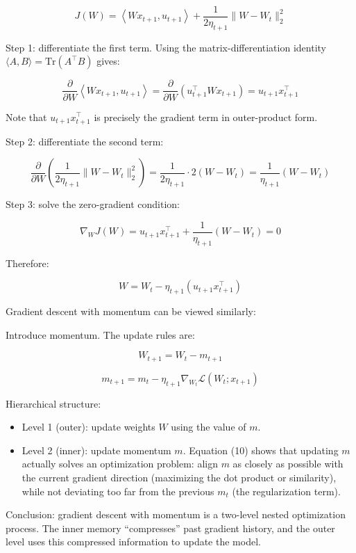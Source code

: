 \[
J(W)=\left\langle Wx_{t+1},u_{t+1}\right\rangle+\frac{1}{2\eta_{t+1}}\lVert W-W_t\rVert_2^2
\]

Step 1: differentiate the first term. Using the matrix-differentiation identity \(\langle A,B\rangle=\mathrm{Tr}(A^\top B)\) gives:

\[
\frac{\partial}{\partial W}\left\langle Wx_{t+1},u_{t+1}\right\rangle
=\frac{\partial}{\partial W}\left(u_{t+1}^{\top}Wx_{t+1}\right)
=u_{t+1}x_{t+1}^{\top}
\]

Note that \(u_{t+1}x_{t+1}^{\top}\) is precisely the gradient term in outer-product form.

Step 2: differentiate the second term:

\[
\frac{\partial}{\partial W}\left(\frac{1}{2\eta_{t+1}}\lVert W-W_t\rVert_2^2\right)
=\frac{1}{2\eta_{t+1}}\cdot 2(W-W_t)
=\frac{1}{\eta_{t+1}}(W-W_t)
\]

Step 3: solve the zero-gradient condition:

\[
\nabla_W J(W)=u_{t+1}x_{t+1}^{\top}+\frac{1}{\eta_{t+1}}(W-W_t)=0
\]

Therefore:

\[
W=W_t-\eta_{t+1}(u_{t+1}x_{t+1}^{\top})
\]

Gradient descent with momentum can be viewed similarly:

Introduce momentum. The update rules are:

\[
W_{t+1}=W_t-m_{t+1}
\tag{7}
\]

\[
m_{t+1}=m_t-\eta_{t+1}\nabla_{W_t}\mathcal{L}(W_t;x_{t+1})
\tag{8}
\]

Hierarchical structure:

\begin{itemize}
\tightlist
\item
  Level 1 (outer): update weights \(W\) using the value of \(m\).
\item
  Level 2 (inner): update momentum \(m\). Equation (10) shows that updating \(m\) actually solves an optimization problem: align \(m\) as closely as possible with the current gradient direction (maximizing the dot product or similarity), while not deviating too far from the previous \(m_t\) (the regularization term).
\end{itemize}

Conclusion: gradient descent with momentum is a two-level nested optimization process. The inner memory ``compresses'' past gradient history, and the outer level uses this compressed information to update the model.

